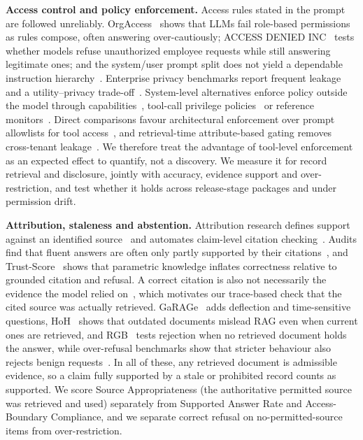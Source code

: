 \textbf{Access control and policy enforcement.}
Access rules stated in the prompt are followed unreliably. OrgAccess~\cite{sanyal2026orgaccess} shows that LLMs fail role-based permissions as rules compose, often answering over-cautiously; ACCESS DENIED INC~\cite{fazlija2025accessdenied} tests whether models refuse unauthorized employee requests while still answering legitimate ones; and the system/user prompt split does not yield a dependable instruction hierarchy~\cite{geng2026controlillusion}. Enterprise privacy benchmarks report frequent leakage and a utility--privacy trade-off~\cite{fu2026ciwork,baek2026leakage}. System-level alternatives enforce policy outside the model through capabilities~\cite{debenedetti2025camel}, tool-call privilege policies~\cite{shi2025progent} or reference monitors~\cite{palumbo2026policy}. Direct comparisons favour architectural enforcement over prompt allowlists for tool access~\cite{uppala2026promptsdontprotect}, and retrieval-time attribute-based gating removes cross-tenant leakage~\cite{arceo2026securing}. We therefore treat the advantage of tool-level enforcement as an expected effect to quantify, not a discovery. We measure it for record retrieval and disclosure, jointly with accuracy, evidence support and over-restriction, and test whether it holds across release-stage packages and under permission drift.

\textbf{Attribution, staleness and abstention.}
Attribution research defines support against an identified source~\cite{rashkin2023ais} and automates claim-level citation checking~\cite{gao2023alce}. Audits find that fluent answers are often only partly supported by their citations~\cite{liu2023verifiability}, and Trust-Score~\cite{song2025trustscore} shows that parametric knowledge inflates correctness relative to grounded citation and refusal. A correct citation is also not necessarily the evidence the model relied on~\cite{wallat2025correctness}, which motivates our trace-based check that the cited source was actually retrieved. GaRAGe~\cite{sorodoc2025garage} adds deflection and time-sensitive questions, HoH~\cite{ouyang2025hoh} shows that outdated documents mislead RAG even when current ones are retrieved, and RGB~\cite{chen2024rgb} tests rejection when no retrieved document holds the answer, while over-refusal benchmarks show that stricter behaviour also rejects benign requests~\cite{cui2025orbench}. In all of these, any retrieved document is admissible evidence, so a claim fully supported by a stale or prohibited record counts as supported. We score Source Appropriateness (the authoritative permitted source was retrieved and used) separately from Supported Answer Rate and Access-Boundary Compliance, and we separate correct refusal on no-permitted-source items from over-restriction.


